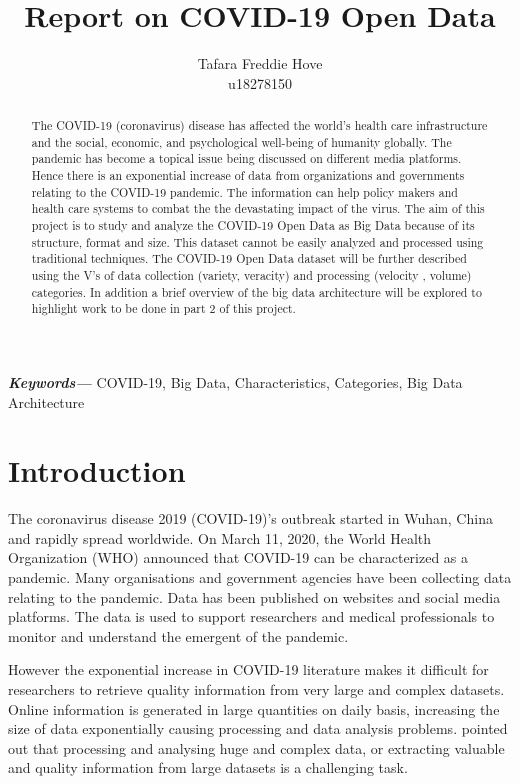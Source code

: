 \documentclass[12pt,letterpaper, twoside]{article}
\title{Report on COVID-19 Open Data}
\author{Tafara Freddie Hove \\
        \small u18278150 \\
}
\date{}
\providecommand{\keywords}[1]
{
  \small	
  \textbf{\textit{Keywords---}} #1 
}
\begin{document}
\maketitle

\begin{abstract}
The COVID-19 (coronavirus) disease has affected the world’s health care infrastructure and the social, economic, and psychological well-being of humanity globally. The pandemic has become a topical issue being discussed on different media platforms. Hence there is an exponential increase of data from organizations and governments relating to the COVID-19 pandemic. The information can help policy makers and health care systems to combat the the devastating impact of the virus. The aim of this project is to study and analyze the COVID-19 Open Data as Big Data because of its structure, format and size. This dataset cannot be easily analyzed and processed using traditional techniques. The COVID-19 Open Data dataset will be further described using the V's of data collection (variety, veracity) and processing (velocity , volume) categories.  In addition a brief overview of the big data architecture will be explored to highlight work to be done in part 2 of this project. 
\end{abstract}\hspace{10pt}
\keywords{COVID-19, Big Data, Characteristics, Categories, Big Data Architecture}
 
\section{Introduction}
The coronavirus disease 2019 (COVID-19)'s outbreak started in Wuhan, China and  rapidly spread worldwide. On March 11, 2020, the World Health Organization (WHO) announced that COVID-19 can be characterized as a pandemic\cite{Gao}. Many organisations and government agencies have been collecting data relating to the pandemic. Data has been published on websites and social media platforms. The data is used to support researchers and medical professionals to monitor and understand the emergent of the pandemic.

However the exponential increase in COVID-19 literature makes it difficult for researchers to retrieve quality information from very large and complex datasets. Online information is generated in large quantities on daily basis, increasing the size of data exponentially causing processing and data analysis problems. \cite{Patel et al} pointed out that processing and analysing huge and complex data, or extracting valuable and quality information from large datasets is a challenging task. 
\end{document}
